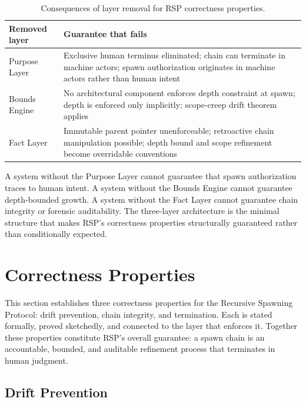 \begin{table}[h]
\centering
\begin{tabular}{p{3.0cm} p{5.5cm}}
\toprule
\textbf{Removed layer} & \textbf{Guarantee that fails} \\
\midrule
Purpose Layer        & Exclusive human terminus eliminated; chain can terminate in machine actors; spawn authorization originates in machine actors rather than human intent \\
Bounds Engine       & No architectural component enforces depth constraint at spawn; depth is enforced only implicitly; scope-creep drift theorem applies \\
Fact Layer          & Immutable parent pointer unenforceable; retroactive chain manipulation possible; depth bound and scope refinement become overridable conventions \\
\bottomrule
\end{tabular}
\caption{Consequences of layer removal for RSP correctness properties.}
\label{tab:layer-minimality-rs}
\end{table}

A system without the Purpose Layer cannot guarantee that spawn authorization traces to human intent. A system without the Bounds Engine cannot guarantee depth-bounded growth. A system without the Fact Layer cannot guarantee chain integrity or forensic auditability. The three-layer architecture is the minimal structure that makes RSP's correctness properties structurally guaranteed rather than conditionally expected.

\section{Correctness Properties}
\label{sec:rs-correctness}

This section establishes three correctness properties for the Recursive Spawning Protocol: drift prevention, chain integrity, and termination. Each is stated formally, proved sketchedly, and connected to the \bxthree{} layer that enforces it. Together these properties constitute RSP's overall guarantee: a spawn chain is an accountable, bounded, and auditable refinement process that terminates in human judgment.

\subsection{Drift Prevention}
\label{sec:rs-drift-prevention}

